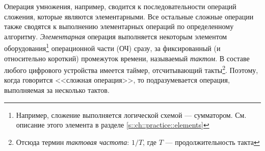 Операция умножения, например, сводится к последовательности операций сложения, которые являются элементарными. Все остальные сложные операции также сводятся к выполнению элементарных операций по определенному алгоритму. \emph{Элементарная} операция выполняется некоторым элементом оборудования\footnote{Например, сложение выполняется логической схемой --- сумматором. См. описание этого элемента в разделе \ref{s::ch::practice::elements}} операционной части (ОЧ) сразу, за фиксированный (и относительно короткий) промежуток времени, называемый \emph{тактом}. В составе любого цифрового устройства имеется таймер, отсчитывающий такты\footnote{Отсюда термин \emph{тактовая частота}: $1/T$, где $T$ --- продолжительность такта}. Поэтому, когда говорится <<сложная операция>>, то подразумевается операция, выполняемая за несколько тактов.

